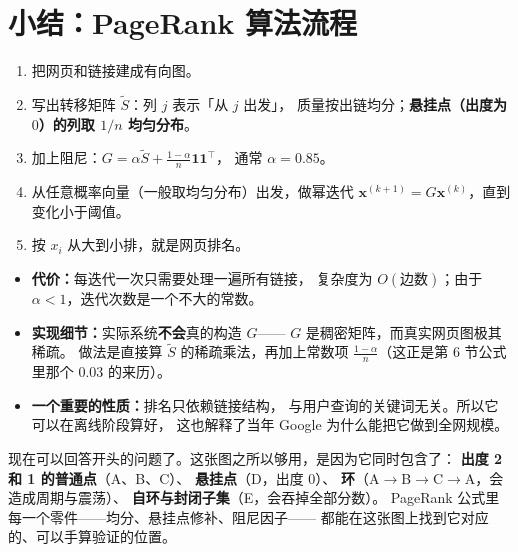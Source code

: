 \documentclass[UTF8,11pt,fontset=macnew]{ctexart}
\newcommand{\xv}{\mathbf{x}}
\newcommand{\one}{\mathbf{1}}
\begin{document}
\section{小结：PageRank 算法流程}

\begin{enumerate}
  \item 把网页和链接建成有向图。
  \item 写出转移矩阵 $\tilde S$：列 $j$ 表示「从 $j$ 出发」，
        质量按出链均分；\textbf{悬挂点（出度为 $0$）的列取 $1/n$ 均匀分布}。
  \item 加上阻尼：$G=\alpha\tilde S+\frac{1-\alpha}{n}\one\one^\top$，
        通常 $\alpha=0.85$。
  \item 从任意概率向量（一般取均匀分布）出发，做幂迭代
        $\xv^{(k+1)}=G\xv^{(k)}$，直到变化小于阈值。
  \item 按 $x_i$ 从大到小排，就是网页排名。
\end{enumerate}

\begin{itemize}
  \item \textbf{代价：}每迭代一次只需要处理一遍所有链接，
        复杂度为 $O(\text{边数})$；由于 $\alpha<1$，迭代次数是一个不大的常数。
  \item \textbf{实现细节：}实际系统\textbf{不会}真的构造 $G$——
        $G$ 是稠密矩阵，而真实网页图极其稀疏。
        做法是直接算 $\tilde S$ 的稀疏乘法，再加上常数项
        $\frac{1-\alpha}{n}$（这正是第 6 节公式里那个 $0.03$ 的来历）。
  \item \textbf{一个重要的性质：}排名只依赖链接结构，
        与用户查询的关键词无关。所以它可以在离线阶段算好，
        这也解释了当年 Google 为什么能把它做到全网规模。
\end{itemize}

\begin{keybox}[回头再看这张五个点的图]
现在可以回答开头的问题了。这张图之所以够用，是因为它同时包含了：
\textbf{出度 2 和 1 的普通点}（A、B、C）、
\textbf{悬挂点}（D，出度 $0$）、
\textbf{环}（A$\to$B$\to$C$\to$A，会造成周期与震荡）、
\textbf{自环与封闭子集}（E，会吞掉全部分数）。
PageRank 公式里每一个零件——均分、悬挂点修补、阻尼因子——
都能在这张图上找到它对应的、可以手算验证的位置。
\end{keybox}
\end{document}
